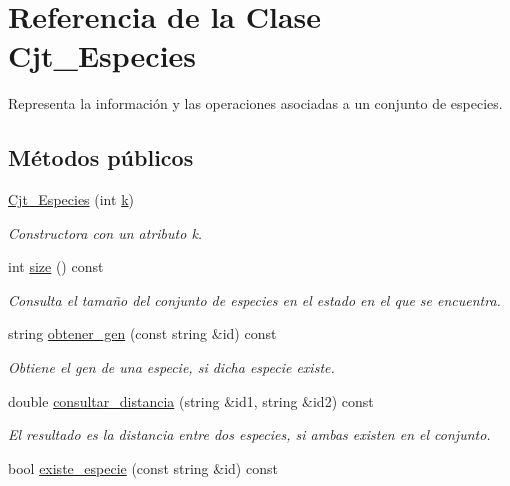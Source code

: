 \hypertarget{class_cjt___especies}{}\section{Referencia de la Clase Cjt\+\_\+\+Especies}
\label{class_cjt___especies}


Representa la información y las operaciones asociadas a un conjunto de especies.  


\subsection*{Métodos públicos}
\begin{DoxyCompactItemize}
\item 
\hyperlink{class_cjt___especies_aeb3b22c649a5c8bfd3dfb66178c54338}{Cjt\+\_\+\+Especies} (int \hyperlink{class_cjt___especies_a4586fb4724b7af4b7f00bb0c0bdd6a17}{k})
\begin{DoxyCompactList}\small\item\em Constructora con un atributo \textquotesingle{}k\textquotesingle{}. \end{DoxyCompactList}\item 
int \hyperlink{class_cjt___especies_a7061cb2108f9be2b12b8f2c5ae99a82d}{size} () const
\begin{DoxyCompactList}\small\item\em Consulta el tamaño del conjunto de especies en el estado en el que se encuentra. \end{DoxyCompactList}\item 
string \hyperlink{class_cjt___especies_a4ac9513af2f0cfe4af1a75bb0d8ecf37}{obtener\+\_\+gen} (const string \&id) const
\begin{DoxyCompactList}\small\item\em Obtiene el gen de una especie, si dicha especie existe. \end{DoxyCompactList}\item 
double \hyperlink{class_cjt___especies_a55f41bd03feccf515a491abca95bd60f}{consultar\+\_\+distancia} (string \&id1, string \&id2) const
\begin{DoxyCompactList}\small\item\em El resultado es la distancia entre dos especies, si ambas existen en el conjunto. \end{DoxyCompactList}\item 
bool \hyperlink{class_cjt___especies_aeb58e5bc1d68b0a7ab59f24e4a99057f}{existe\+\_\+especie} (const string \&id) const

\end{DoxyCompactItemize}
